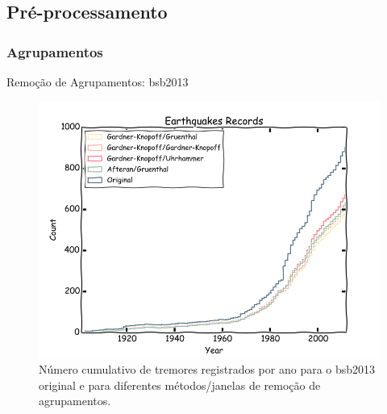 \documentclass[ucs,8pt]{beamer}
\begin{document}
\subsection{Pré-processamento}

\subsubsection{Agrupamentos}

\begin{frame}{Remoção de Agrupamentos: \gls{bsb2013}}
\begin{figure}[H]
	\centering
	\includegraphics[height=0.90\textheight]{decluster_br}
	\caption{Número cumulativo de tremores registrados por ano para o \gls{bsb2013}
	original e para diferentes métodos/janelas de remoção de agrupamentos.}
	\label{fig:br_eq_record}
\end{figure}
\end{frame}
\end{document}
